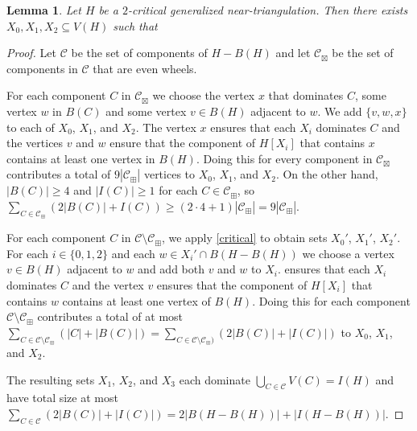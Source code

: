 \documentclass{article}
\newtheorem{lem}{Lemma}
\theoremstyle{definition}
\begin{document}
\begin{lem}\label{three_sets_coverage}
  Let $H$ be a $2$-critical generalized near-triangulation.  Then there exists $X_0,X_1,X_2\subseteq V(H)$ such that
\end{lem}

\begin{proof}
  Let $\mathcal{C}$ be the set of components of $H-B(H)$
  and let $\mathcal{C}_{\boxtimes}$ be the set of components in $\mathcal{C}$  that are even wheels.

  For each component $C$ in $\mathcal{C}_{\boxtimes}$ we choose the vertex $x$ that dominates $C$, some vertex $w$ in $B(C)$ and some vertex $v\in B(H)$ adjacent to $w$.  We add $\{v,w,x\}$ to each of $X_0$, $X_1$, and $X_2$. The vertex $x$ ensures that each $X_i$ dominates $C$ and the vertices $v$ and $w$ ensure that the component of $H[X_i]$ that contains $x$ contains at least one vertex in $B(H)$.  Doing this for every component in $\mathcal{C}_{\boxtimes}$ contributes a total of $9|\mathcal{C}_{\boxplus}|$ vertices to $X_0$, $X_1$, and $X_2$. On the other hand, $|B(C)|\ge 4$ and $|I(C)|\ge 1$ for each $C\in \mathcal{C}_{\boxplus}$, so $\sum_{C\in \mathcal{C}_{\boxplus}} (2|B(C)| + I(C))\ge (2\cdot 4+1)|\mathcal{C}_{\boxplus}| = 9|\mathcal{C}_{\boxplus}|$.

  For each component $C$ in $\mathcal{C}\setminus\mathcal{C}_{\boxplus}$, we apply \cref{critical} to obtain sets $X_0'$, $X_1'$, $X_2'$. For each $i\in\{0,1,2\}$ and each $w\in X_i'\cap B(H-B(H))$ we choose a vertex $v\in B(H)$ adjacent to $w$ and add both $v$ and $w$ to $X_i$.  ensures that each $X_i$ dominates $C$ and the vertex $v$ ensures that the component of $H[X_i]$ that contains $w$ contains at least one vertex of $B(H)$.
  Doing this for each component $\mathcal{C}\setminus\mathcal{C}_\boxplus$ contributes a total of at most  $\sum_{C\in\mathcal{C}\setminus\mathcal{C}_{\boxplus}}(|C|+|B(C)|)=\sum_{C\in\mathcal{C}\setminus \mathcal{C}_{\boxplus})}(2|B(C)|+|I(C)|)$ to $X_0$, $X_1$, and $X_2$.

  The resulting sets $X_1$, $X_2$, and $X_3$ each dominate $\bigcup_{C\in\mathcal{C}} V(C)=I(H)$ and have total size at most $\sum_{C\in\mathcal{C}} (2|B(C)|+|I(C)|) = 2|B(H-B(H))| + |I(H-B(H))|$.
\end{proof}
\end{document}
